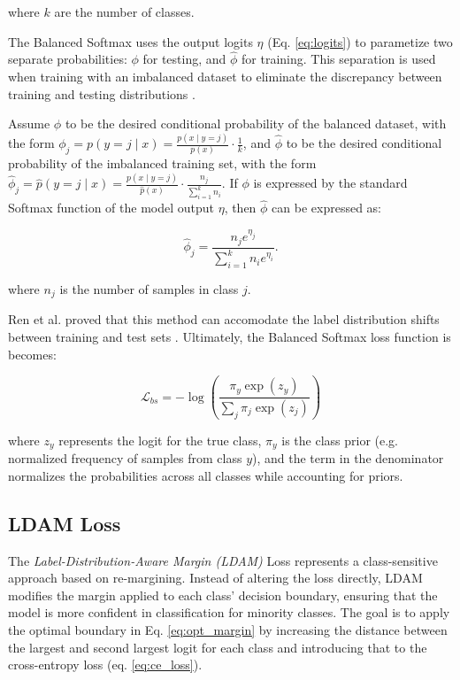 \noindent where $k$ are the number of classes.

The Balanced Softmax uses the output logits $\eta$ (Eq. \eqref{eq:logits}) to parametize two separate probabilities: $\phi$ for testing, and $\hat{\phi}$ for training. This separation is used when training with an imbalanced dataset to eliminate the discrepancy between training and testing distributions \cite{ren2020balancedmetasoftmaxlongtailedvisual}.

Assume $\phi$ to be the desired conditional probability of the balanced dataset, with the form $\phi_j = p(y = j \mid x) = \frac{p(x \mid y=j)}{p(x)} \cdot \frac{1}{k}$, and $\hat{\phi}$ to be the desired conditional probability of the imbalanced training set, with the form $\hat{\phi}_j = \hat{p}(y = j \mid x) = \frac{p(x \mid y=j)}{\hat{p}(x)} \cdot \frac{n_j}{\sum_{i=1}^{k} n_i}$. If $\phi$ is expressed by the standard Softmax function of the model output $\eta$, then $\hat{\phi}$ can be expressed as:

\begin{equation}
    \hat{\phi}_j = \frac{n_j e^{\eta_j}}{\sum_{i=1}^{k} n_i e^{\eta_i}}.
\end{equation}

\noindent where $n_j$ is the number of samples in class $j$.

Ren et al. \cite{ren2020balancedmetasoftmaxlongtailedvisual} proved that this method can accomodate the label distribution shifts between training and test sets \cite{ren2020balancedmetasoftmaxlongtailedvisual}. Ultimately, the Balanced Softmax loss function is becomes:

\begin{equation}
    \mathcal{L}_{bs} = - \log\left( \frac{\pi_y \exp(z_y)}{\sum_j \pi_j \exp(z_j)} \right)
\end{equation}

\noindent where $z_y$ represents the logit for the true class, $\pi_y$ is the class prior (e.g. normalized frequency of samples from class $y$), and the term in the denominator normalizes the probabilities across all classes while accounting for priors.




\subsection{LDAM Loss}
\label{sec:ldam_loss}
The \emph{Label-Distribution-Aware Margin (LDAM)} Loss \cite{cao2019learningimbalanceddatasetslabeldistributionaware} represents a class-sensitive approach based on re-margining. Instead of altering the loss directly, LDAM modifies the margin applied to each class' decision boundary, ensuring that the model is more confident in classification for minority classes. The goal is to apply the optimal boundary in Eq. \eqref{eq:opt_margin} by increasing the distance between the largest and second largest logit for each class and introducing that to the cross-entropy loss (eq. \eqref{eq:ce_loss}).


